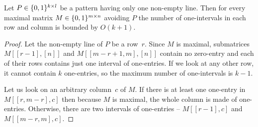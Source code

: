 \begin{lemma}
Let $P\in\{0,1\}^{k\times l}$ be a pattern having only one non-empty line. Then for every maximal matrix $M\in\{0,1\}^{m\times n}$ avoiding $P$ the number of one-intervals in each row and column is bounded by $O(k+1)$. 
\end{lemma}
\begin{proof}
Let the non-empty line of $P$ be a row~$r$. Since $M$ is maximal, submatrices $M[[r-1],[n]]$ and $M[[m-r+1,m],[n]]$ contain no zero-entry and each of their rows contains just one interval of one-entries. If we look at any other row, it cannot contain $k$ one-entries, so the maximum number of one-intervals is $k-1$.

Let us look on an arbitrary column~$c$ of $M$. If there is at least one one-entry in $M[[r,m-r],c]$ then because $M$ is maximal, the whole column is made of one-entries. Otherwise, there are two intervals of one-entries -- $M[[r-1],c]$ and $M[[m-r,m],c]$.
\end{proof}

